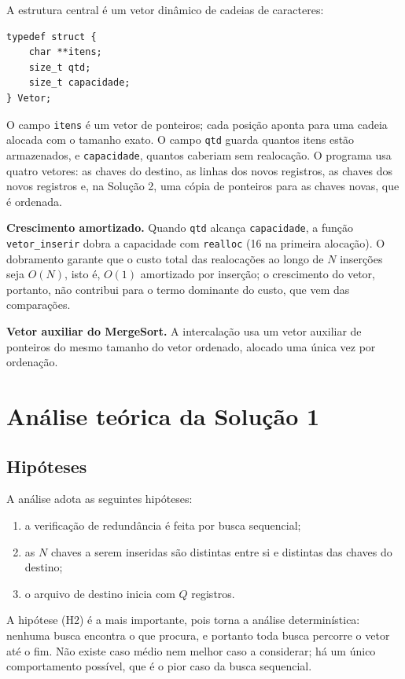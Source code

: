 \documentclass[11pt,a4paper]{article}
\begin{document}
A estrutura central é um vetor dinâmico de cadeias de caracteres:

\begin{lstlisting}[caption={Estrutura de dados \texttt{Vetor}}]
typedef struct {
    char **itens;
    size_t qtd;
    size_t capacidade;
} Vetor;
\end{lstlisting}

O campo \texttt{itens} é um vetor de ponteiros; cada posição aponta para uma cadeia alocada com o tamanho exato. O campo \texttt{qtd} guarda quantos itens estão armazenados, e \texttt{capacidade}, quantos caberiam sem realocação. O programa usa quatro vetores: as chaves do destino, as linhas dos novos registros, as chaves dos novos registros e, na Solução 2, uma cópia de ponteiros para as chaves novas, que é ordenada.

\textbf{Crescimento amortizado.} Quando \texttt{qtd} alcança \texttt{capacidade}, a função \texttt{vetor\_inserir} dobra a capacidade com \texttt{realloc} (16 na primeira alocação). O dobramento garante que o custo total das realocações ao longo de $N$ inserções seja $O(N)$, isto é, $O(1)$ amortizado por inserção; o crescimento do vetor, portanto, não contribui para o termo dominante do custo, que vem das comparações.

\textbf{Vetor auxiliar do MergeSort.} A intercalação usa um vetor auxiliar de ponteiros do mesmo tamanho do vetor ordenado, alocado uma única vez por ordenação.

\section{Análise teórica da Solução 1}

\subsection{Hipóteses}

A análise adota as seguintes hipóteses:
\begin{enumerate}[label=\textbf{(H\arabic*)},itemsep=1pt]
  \item a verificação de redundância é feita por busca sequencial;
  \item as $N$ chaves a serem inseridas são distintas entre si e distintas das chaves do destino;
  \item o arquivo de destino inicia com $Q$ registros.
\end{enumerate}

A hipótese (H2) é a mais importante, pois torna a análise determinística: nenhuma busca encontra o que procura, e portanto toda busca percorre o vetor até o fim. Não existe caso médio nem melhor caso a considerar; há um único comportamento possível, que é o pior caso da busca sequencial.
\end{document}
